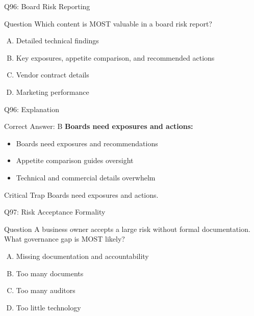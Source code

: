 \documentclass{beamer}
\begin{document}
	\begin{frame}{Q96: Board Risk Reporting}
		\begin{block}{Question}
			Which content is MOST valuable in a board risk report?
		\end{block}
		\begin{enumerate}[(A)]
			\item Detailed technical findings
			\item Key exposures, appetite comparison, and recommended actions
			\item Vendor contract details
			\item Marketing performance
		\end{enumerate}
	\end{frame}
	
	\begin{frame}{Q96: Explanation}
		\begin{block}{Correct Answer: B}
			\textbf{Boards need exposures and actions:}
			\begin{itemize}
				\item Boards need exposures and recommendations
				\item Appetite comparison guides oversight
				\item Technical and commercial details overwhelm
			\end{itemize}
		\end{block}
		\begin{alertblock}{Critical Trap}
			Boards need exposures and actions.
		\end{alertblock}
	\end{frame}
	
	\begin{frame}{Q97: Risk Acceptance Formality}
		\begin{block}{Question}
			A business owner accepts a large risk without formal documentation. What governance gap is MOST likely?
		\end{block}
		\begin{enumerate}[(A)]
			\item Missing documentation and accountability
			\item Too many documents
			\item Too many auditors
			\item Too little technology
		\end{enumerate}
	\end{frame}
	
\end{document}
